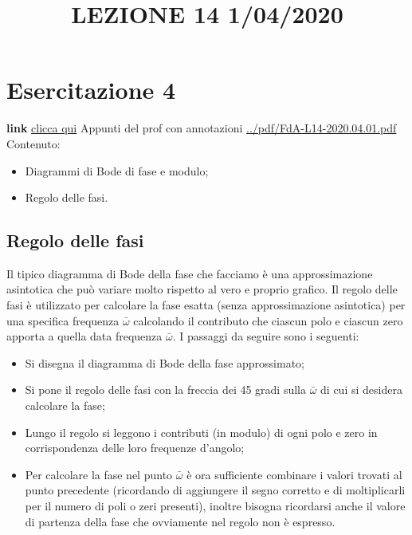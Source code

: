 \section{Esercitazione 4}
\title{LEZIONE 14 1/04/2020}\newline
\textbf{link} \href{https://web.microsoftstream.com/video/7cfe3714-fd1e-453f-8394-f7abd4d747ad?list=user&userId=faa91214-a6f5-40d7-8875-253fd49b8ce1}{clicca qui}\newline
\newline
Appunti del prof con annotazioni \url{../pdf/FdA-L14-2020.04.01.pdf}\newline
Contenuto:
\begin{itemize}
    \item Diagrammi di Bode di fase e modulo;
    \item Regolo delle fasi.
\end{itemize}
\subsection{Regolo delle fasi}
Il tipico diagramma di Bode della fase che facciamo è una approssimazione asintotica che può variare molto rispetto al vero e proprio grafico. Il regolo delle fasi è utilizzato per calcolare la fase esatta (senza approssimazione asintotica) per una specifica frequenza $\bar{\omega}$ calcolando il contributo che ciascun polo e ciascun zero apporta a quella data frequenza $\bar{\omega}$.\newline
\newline
I passaggi da seguire sono i seguenti:
\begin{itemize}
    \item Si disegna il diagramma di Bode della fase approssimato;
    \item Si pone il regolo delle fasi con la freccia dei 45 gradi sulla $\bar{\omega}$ di cui si desidera calcolare la fase;
    \item Lungo il regolo si leggono i contributi (in modulo) di ogni polo e zero in corrispondenza delle loro frequenze d'angolo;
    \item Per calcolare la fase nel punto $\bar{\omega}$ è ora sufficiente combinare i valori trovati al punto precedente (ricordando di aggiungere il segno corretto e  di moltiplicarli per il numero di poli o zeri presenti), inoltre bisogna ricordarsi anche il valore di partenza della fase che ovviamente nel regolo non è espresso.
\end{itemize}